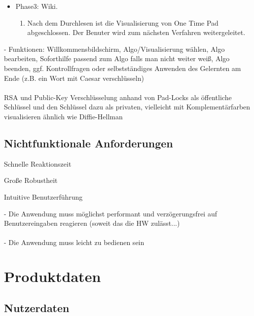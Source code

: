 \documentclass{article}
\begin{document}
\begin{itemize}[label={}]
\item Phase3: Wiki.
\begin{enumerate}
\item Nach dem Durchlesen ist die Visualisierung von One Time Pad abgeschlossen. Der Benuter wird zum nächsten Verfahren weitergeleitet.
\end{enumerate}
\end{itemize}

- Funktionen: Willkommensbildschirm, Algo/Visualisierung wählen, Algo bearbeiten, 
Soforthilfe passend zum Algo falls man nicht weiter weiß, Algo beenden, 
ggf. Kontrollfragen oder selbstständiges Anwenden des Gelernten am Ende (z.B. ein Wort mit Caesar verschlüsseln)
\\
\\
RSA und Public-Key Verschlüsselung anhand von Pad-Locks als 
öffentliche Schlüssel und den Schlüssel  dazu als privaten,
vielleicht mit Komplementärfarben visualisieren ähnlich wie Diffie-Hellman



\subsection{Nichtfunktionale Anforderungen}

\begin{NA}[start=100]
\item Schnelle Reaktionszeit
\end{NA}
\begin{NA}[start=200]
\item Große Robustheit
\end{NA}
\begin{NA}[start=300]
\item Intuitive Benutzerführung
\end{NA}

- Die Anwendung muss möglichst performant und verzögerungsfrei auf Benutzereingaben reagieren (soweit das die HW zulässt...)
\\
\\
- Die Anwendung muss leicht zu bedienen sein

\section{Produktdaten}

\subsection{Nutzerdaten}
\end{document}
